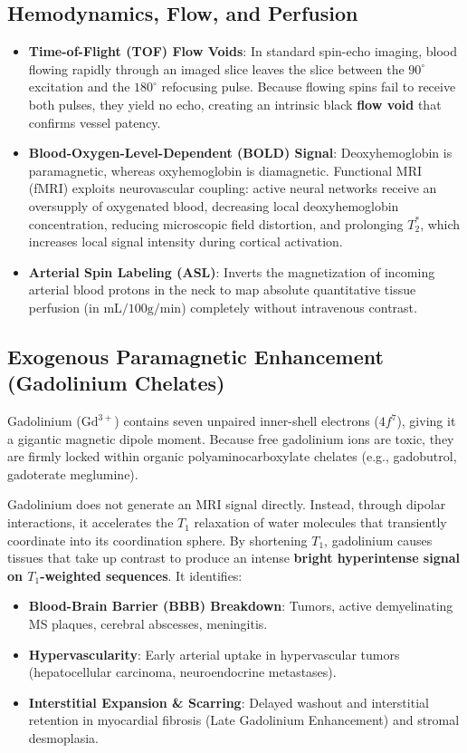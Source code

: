 \documentclass[11pt,a4paper]{article}
\begin{document}
\subsection{Hemodynamics, Flow, and Perfusion}
\begin{itemize}[leftmargin=*]
    \item \textbf{Time-of-Flight (TOF) Flow Voids}: In standard spin-echo imaging, blood flowing rapidly through an imaged slice leaves the slice between the $90^\circ$ excitation and the $180^\circ$ refocusing pulse. Because flowing spins fail to receive both pulses, they yield no echo, creating an intrinsic black \textbf{flow void} that confirms vessel patency.
    \item \textbf{Blood-Oxygen-Level-Dependent (BOLD) Signal}: Deoxyhemoglobin is paramagnetic, whereas oxyhemoglobin is diamagnetic. Functional MRI (fMRI) exploits neurovascular coupling: active neural networks receive an oversupply of oxygenated blood, decreasing local deoxyhemoglobin concentration, reducing microscopic field distortion, and prolonging $T_2^*$, which increases local signal intensity during cortical activation.
    \item \textbf{Arterial Spin Labeling (ASL)}: Inverts the magnetization of incoming arterial blood protons in the neck to map absolute quantitative tissue perfusion (in $\text{mL}/100\text{g}/\text{min}$) completely without intravenous contrast.
\end{itemize}

\subsection{Exogenous Paramagnetic Enhancement (Gadolinium Chelates)}
Gadolinium ($\text{Gd}^{3+}$) contains seven unpaired inner-shell electrons ($4f^7$), giving it a gigantic magnetic dipole moment. Because free gadolinium ions are toxic, they are firmly locked within organic polyaminocarboxylate chelates (e.g., gadobutrol, gadoterate meglumine).

Gadolinium does not generate an MRI signal directly. Instead, through dipolar interactions, it accelerates the $T_1$ relaxation of water molecules that transiently coordinate into its coordination sphere. By shortening $T_1$, gadolinium causes tissues that take up contrast to produce an intense \textbf{bright hyperintense signal on $T_1$-weighted sequences}. It identifies:
\begin{itemize}
    \item \textbf{Blood-Brain Barrier (BBB) Breakdown}: Tumors, active demyelinating MS plaques, cerebral abscesses, meningitis.
    \item \textbf{Hypervascularity}: Early arterial uptake in hypervascular tumors (hepatocellular carcinoma, neuroendocrine metastases).
    \item \textbf{Interstitial Expansion \& Scarring}: Delayed washout and interstitial retention in myocardial fibrosis (Late Gadolinium Enhancement) and stromal desmoplasia.
\end{itemize}
\end{document}

